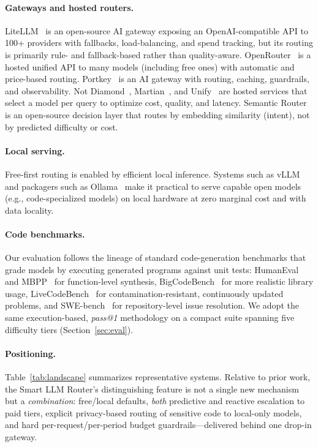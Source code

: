 \documentclass[11pt]{article}
\begin{document}
\paragraph{Gateways and hosted routers.}
LiteLLM~\cite{litellm} is an open-source AI gateway exposing an
OpenAI-compatible API to 100+ providers with fallbacks, load-balancing, and
spend tracking, but its routing is primarily rule- and fallback-based rather
than quality-aware. OpenRouter~\cite{openrouter} is a hosted unified API to many
models (including free ones) with automatic and price-based routing. Portkey~
\cite{portkey} is an AI gateway with routing, caching, guardrails, and
observability. Not Diamond~\cite{notdiamond}, Martian~\cite{martian}, and
Unify~\cite{unify} are hosted services that select a model per query to optimize
cost, quality, and latency. Semantic Router~\cite{semanticrouter} is an
open-source decision layer that routes by embedding similarity (intent), not by
predicted difficulty or cost.

\paragraph{Local serving.}
Free-first routing is enabled by efficient local inference. Systems such as
vLLM~\cite{vllm} and packagers such as Ollama~\cite{ollama} make it practical to
serve capable open models (e.g., code-specialized models) on local hardware at
zero marginal cost and with data locality.

\paragraph{Code benchmarks.}
Our evaluation follows the lineage of standard code-generation benchmarks that
grade models by executing generated programs against unit tests:
HumanEval~\cite{humaneval} and MBPP~\cite{mbpp} for function-level synthesis,
BigCodeBench~\cite{bigcodebench} for more realistic library usage,
LiveCodeBench~\cite{livecodebench} for contamination-resistant, continuously
updated problems, and SWE-bench~\cite{swebench} for repository-level issue
resolution. We adopt the same execution-based, \emph{pass@1} methodology on a
compact suite spanning five difficulty tiers (Section~\ref{sec:eval}).

\paragraph{Positioning.}
Table~\ref{tab:landscape} summarizes representative systems. Relative to prior
work, the Smart LLM Router's distinguishing feature is not a single new
mechanism but a \emph{combination}: free/local defaults, \emph{both} predictive
and reactive escalation to paid tiers, explicit privacy-based routing of
sensitive code to local-only models, and hard per-request/per-period budget
guardrails---delivered behind one drop-in gateway.
\end{document}
